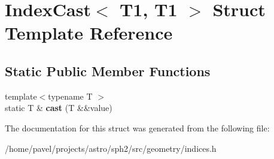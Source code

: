 \hypertarget{structIndexCast_3_01T1_00_01T1_01_4}{}\section{Index\+Cast$<$ T1, T1 $>$ Struct Template Reference}
\label{structIndexCast_3_01T1_00_01T1_01_4}
\subsection*{Static Public Member Functions}
\begin{DoxyCompactItemize}
\item 
\hypertarget{structIndexCast_3_01T1_00_01T1_01_4_a7fe16b3c27e5aac6e4a65bd2cdff5380}{}\label{structIndexCast_3_01T1_00_01T1_01_4_a7fe16b3c27e5aac6e4a65bd2cdff5380} 
{\footnotesize template$<$typename T $>$ }\\static T \& {\bfseries cast} (T \&\&value)
\end{DoxyCompactItemize}


The documentation for this struct was generated from the following file\+:\begin{DoxyCompactItemize}
\item 
/home/pavel/projects/astro/sph2/src/geometry/indices.\+h\end{DoxyCompactItemize}
